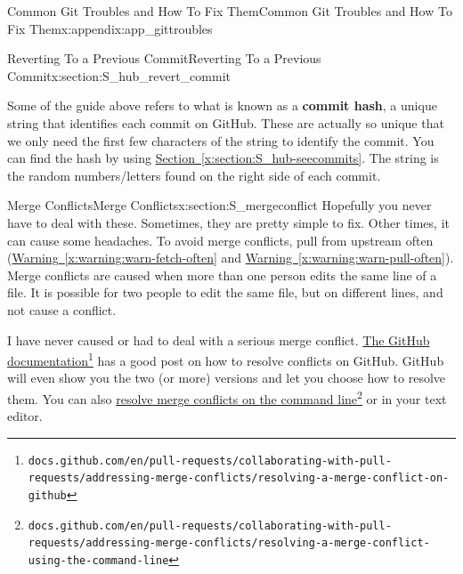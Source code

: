 \documentclass[oneside,10pt,]{book}
\newcommand{\xreffont}{\relax}
\newcommand{\terminology}[1]{\textbf{#1}}
\begin{document}
\begin{appendixptx}{Common Git Troubles and How To Fix Them}{}{Common Git Troubles and How To Fix Them}{}{}{x:appendix:app_gittroubles}
\begin{sectionptx}{Reverting To a Previous Commit}{}{Reverting To a Previous Commit}{}{}{x:section:S_hub_revert_commit}
\par
Some of the guide above refers to what is known as a \terminology{commit hash}, a unique string that identifies each commit on GitHub. These are actually so unique that we only need the first few characters of the string to identify the commit. You can find the hash by using \hyperref[x:section:S_hub-seecommits]{Section~{\xreffont\ref{x:section:S_hub-seecommits}}}. The string is the random numbers\slash{}letters found on the right side of each commit.%
\end{sectionptx}
%
%
\typeout{************************************************}
\typeout{************************************************}
%
\begin{sectionptx}{Merge Conflicts}{}{Merge Conflicts}{}{}{x:section:S_mergeconflict}
Hopefully you never have to deal with these. Sometimes, they are pretty simple to fix. Other times, it can cause some headaches. To avoid merge conflicts, pull from upstream often (\hyperref[x:warning:warn-fetch-often]{Warning~{\xreffont\ref{x:warning:warn-fetch-often}}} and \hyperref[x:warning:warn-pull-often]{Warning~{\xreffont\ref{x:warning:warn-pull-often}}}). Merge conflicts are caused when more than one person edits the same line of a file. It is possible for two people to edit the same file, but on different lines, and not cause a conflict.%
\par
I have never caused or had to deal with a serious merge conflict. \href{https://docs.github.com/en/pull-requests/collaborating-with-pull-requests/addressing-merge-conflicts/resolving-a-merge-conflict-on-github}{The GitHub documentation}\footnote{\nolinkurl{docs.github.com/en/pull-requests/collaborating-with-pull-requests/addressing-merge-conflicts/resolving-a-merge-conflict-on-github}\label{g:fn:idp617025208}} has a good post on how to resolve conflicts on GitHub. GitHub will even show you the two (or more) versions and let you choose how to resolve them. You can also \href{https://docs.github.com/en/pull-requests/collaborating-with-pull-requests/addressing-merge-conflicts/resolving-a-merge-conflict-using-the-command-line}{resolve merge conflicts on the command line}\footnote{\nolinkurl{docs.github.com/en/pull-requests/collaborating-with-pull-requests/addressing-merge-conflicts/resolving-a-merge-conflict-using-the-command-line}\label{g:fn:idp617025976}} or in your text editor.%
\par

\end{sectionptx}
\end{appendixptx}
\end{document}

